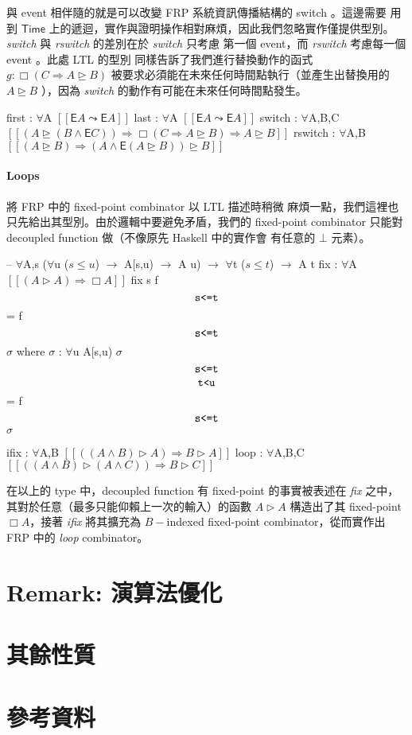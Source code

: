 \documentclass{article}
\newcommand{\llens}{[\![}
\newcommand{\rlens}{]\!]}
\newcommand{\Time}{\mathsf{Time}}
\newcommand{\TE}{\mathsf{E}}
\newcommand{\Wit}[1]{$\,\text{\texttt{#1}}\,$}
\newcommand{\Gs}{\sigma}
\begin{document}
  與 event 相伴隨的就是可以改變 FRP 系統資訊傳播結構的 switch 。這邊需要
  用到 $\Time$ 上的遞迴，實作與證明操作相對麻煩，因此我們忽略實作僅提供型別。
  \textit{switch} 與 \textit{rswitch} 的差別在於 \textit{switch} 只考慮
  第一個 event，而 \textit{rswitch} 考慮每一個 event 。此處 LTL 的型別
  同樣告訴了我們進行替換動作的函式 $g : \Box (C \Rightarrow A \unrhd B)$
  被要求必須能在未來任何時間點執行（並產生出替換用的 $A\unrhd B$ ），因為
  \textit{switch} 的動作有可能在未來任何時間點發生。

  \begin{code}
  first : $\forall${A} $\llens \TE A\leadsto \TE A\rlens$
  last : $\forall${A} $\llens \TE A\leadsto \TE A\rlens$
  switch : $\forall${A,B,C} $\llens (A\unrhd (B\land \TE C))\Rightarrow \Box(C\Rightarrow A\unrhd B) \Rightarrow A\unrhd B\rlens$
  rswitch : $\forall${A,B} $\llens (A\unrhd B) \Rightarrow (A\land \TE(A\unrhd B))\unrhd B\rlens$
  \end{code}
  \paragraph{Loops} 將 FRP 中的 fixed-point combinator 以 LTL 描述時稍微
  麻煩一點，我們這裡也只先給出其型別。由於邏輯中要避免矛盾，我們的 fixed-point
  combinator 只能對 decoupled function 做（不像原先 Haskell 中的實作會
  有任意的 $\bot$ 元素）。

  \begin{code}
  -- $\forall${A,s} ($\forall${u} ($s\le u$) $\to$ A[s,u) $\to$ A u) $\to$ $\forall${t} ($s\le t$) $\to$ A t
  fix : $\forall${A} $\llens (A\rhd A) \Rightarrow \Box A\rlens$
  fix {s} f $\Wit{s<=t}$ = f $\Wit{s<=t}$ $\Gs$ where
      $\Gs$ : $\forall${u} A[s,u)
      $\Gs$ $\Wit{s<=t}$ $\Wit{t<u}$ = f $\Wit{s<=t}$ $\Gs$

  ifix : $\forall${A,B} $\llens ((A\land B)\rhd A) \Rightarrow B\rhd A\rlens$
  loop : $\forall${A,B,C} $\llens ((A\land B)\rhd (A\land C)) \Rightarrow B\rhd C\rlens$
  \end{code}

  在以上的 type 中，decoupled function 有 fixed-point 的事實被表述在
  \textit{fix} 之中，其對於任意（最多只能仰賴上一次的輸入）的函數
  $A\rhd A$ 構造出了其 fixed-point $\Box A$，接著 \textit{ifix} 將其擴充為
  $B-$indexed fixed-point combinator，從而實作出 FRP 中的 \textit{loop}
  combinator。

\section{Remark: 演算法優化}
\section{其餘性質}
\section{參考資料}
\end{document}
